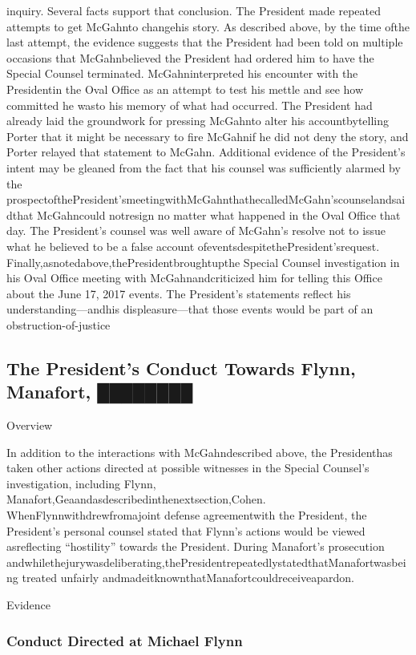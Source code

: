 inquiry.
Several facts support that conclusion. The President made repeated attempts to get McGahnto changehis story. As described above, by the time ofthe last attempt, the evidence suggests that the President had been told on multiple occasions that McGahnbelieved the President had ordered him to have the Special Counsel terminated. McGahninterpreted his encounter with the Presidentin the Oval Office as an attempt to test his mettle and see how committed he wasto his memory of what had occurred. The President had already laid the groundwork for pressing McGahnto alter his accountbytelling Porter that it might be necessary to fire McGahnif he did not deny the story, and Porter relayed that statement to McGahn. Additional evidence of the President’s intent may be gleaned from the fact that his counsel was sufficiently alarmed by the prospectofthePresident’smeetingwithMcGahnthathecalledMcGahn’scounselandsaidthat McGahncould notresign no matter what happened in the Oval Office that day. The President’s counsel was well aware of McGahn’s resolve not to issue what he believed to be a false account ofeventsdespitethePresident’srequest. Finally,asnotedabove,thePresidentbroughtupthe Special Counsel investigation in his Oval Office meeting with McGahnandcriticized him for telling this Office about the June 17, 2017 events. The President’s statements reflect his understanding—andhis displeasure—that those events would be part of an obstruction-of-justice

\subsection{The President’s Conduct Towards Flynn, Manafort, ████████}

Overview

In addition to the interactions with McGahndescribed above, the Presidenthas taken other actions directed at possible witnesses in the Special Counsel’s investigation, including Flynn, Manafort,Geaandasdescribedinthenextsection,Cohen. WhenFlynnwithdrewfromajoint defense agreementwith the President, the President’s personal counsel stated that Flynn’s actions would be viewed asreflecting “hostility” towards the President. During Manafort’s prosecution andwhilethejurywasdeliberating,thePresidentrepeatedlystatedthatManafortwasbeing treated unfairly andmadeitknownthatManafortcouldreceiveapardon.

Evidence

\subsubsection{Conduct Directed at Michael Flynn}

